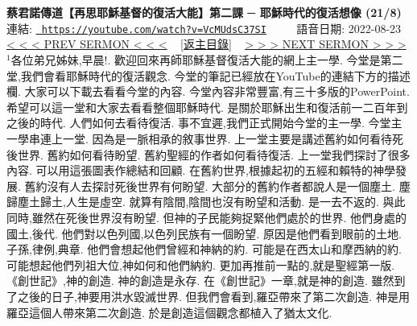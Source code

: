 \documentclass{book}
\begin{document}
\section{}
\label{sec:VcMUdsC37SI}
\textbf{蔡君諾傳道【再思耶穌基督的復活大能】第二課 ─ 耶穌時代的復活想像 (21/8)}
\newline
\newline
連結: \href{https://youtube.com/watch?v=VcMUdsC37SI}{\texttt{ https://youtube.com/watch?v=VcMUdsC37SI}} ~~~~ 語音日期: 2022-08-23 
\newline
\newline
\hyperref[sec:A3YDD55lCCE]{\small{< < < PREV SERMON < < <}}
~
\hyperref[sec:index]{\small{[返主目錄]}}
~
\hyperref[sec:UH_c8ivdgzM]{\small{> > > NEXT SERMON > > >}}
\newline
\newline
$^{1}$各位弟兄姊妹,早晨!.
歡迎回來再師耶穌基督復活大能的網上主一學.
今堂是第二堂,我們會看耶穌時代的復活觀念.
今堂的筆記已經放在YouTube的連結下方的描述欄.
大家可以下載去看看今堂的內容.
今堂內容非常豐富,有三十多版的PowerPoint.
希望可以這一堂和大家去看看整個耶穌時代.
是關於耶穌出生和復活前一二百年到之後的時代.
人們如何去看待復活.
事不宜遲,我們正式開始今堂的主一學.
今堂主一學串連上一堂.
因為是一脈相承的敘事世界.
上一堂主要是講述舊約如何看待死後世界.
舊約如何看待盼望.
舊約聖經的作者如何看待復活.
上一堂我們探討了很多內容.
可以用這張圖表作總結和回顧.
在舊約世界,根據起初的五經和賴特的神學發展.
舊約沒有人去探討死後世界有何盼望.
大部分的舊約作者都說人是一個塵土.
塵歸塵土歸土,人生是虛空.
就算有陰間,陰間也沒有盼望和活動.
是一去不返的.
與此同時,雖然在死後世界沒有盼望.
但神的子民能夠捉緊他們處於的世界.
他們身處的國土,後代.
他們對以色列國,以色列民族有一個盼望.
原因是他們看到眼前的土地.
子孫,律例,典章.
他們會想起他們曾經和神納的約.
可能是在西太山和摩西納的約.
可能想起他們列祖大位,神如何和他們納約.
更加再推前一點的,就是聖經第一版.
《創世記》,神的創造.
神的創造是永存.
在《創世記》一章,就是神的創造.
雖然到了之後的日子,神要用洪水毀滅世界.
但我們會看到,羅亞帶來了第二次創造.
神是用羅亞這個人帶來第二次創造.
於是創造這個觀念都植入了猶太文化.
\end{document}
